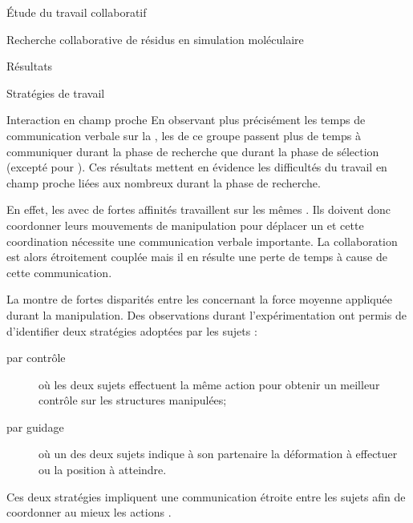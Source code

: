 \documentclass[myfrancais]{mythesis}
\begin{document}
\begin{mypart}{Étude du travail collaboratif}
\begin{mychapter}{Recherche collaborative de résidus en simulation moléculaire}
\begin{mysection}{Résultats}
\begin{mysubsection}{Stratégies de travail}
\begin{mysubsubsection}{Interaction en champ proche}
						En observant plus précisément les temps de communication verbale sur la , les  de ce groupe passent plus de temps à communiquer durant la phase de recherche que durant la phase de sélection (excepté pour ).
						Ces résultats mettent en évidence les difficultés du travail en champ proche liées aux nombreux  durant la phase de recherche.

						En effet, les  avec de fortes affinités travaillent sur les mêmes .
						Ils doivent donc coordonner leurs mouvements de manipulation pour déplacer un  et cette coordination nécessite une communication verbale importante.
						La collaboration est alors étroitement couplée mais il en résulte une perte de temps à cause de cette communication.

						La  montre de fortes disparités entre les  concernant la force moyenne appliquée durant la manipulation.
						Des observations durant l'expérimentation ont permis de d'identifier deux stratégies adoptées par les sujets :
						\begin{description}
							\item[par contrôle] où les deux sujets effectuent la même action pour obtenir un meilleur contrôle sur les structures manipulées;
							\item[par guidage] où un des deux sujets indique à son partenaire la déformation à effectuer ou la position à atteindre.
						\end{description}
						Ces deux stratégies impliquent une communication étroite entre les sujets afin de coordonner au mieux les actions .


\end{mysubsubsection}
\end{mysubsection}
\end{mysection}
\end{mychapter}
\end{mypart}
\end{document}
